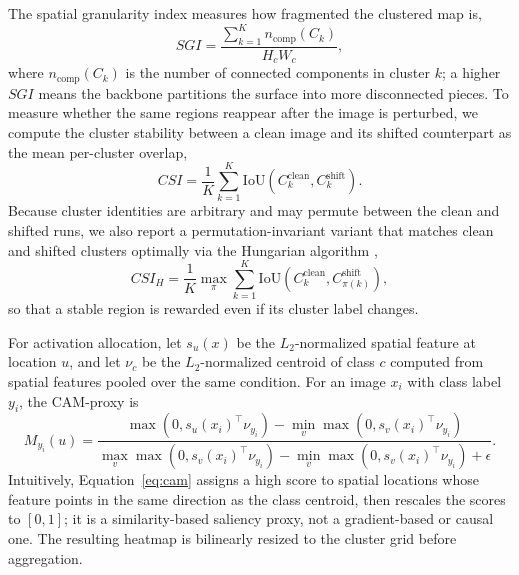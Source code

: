 \documentclass[a4paper,fleqn]{els-cas-templates/cas-sc}
\begin{document}
The spatial granularity index measures how fragmented the clustered map is,
\begin{equation}
  SGI=\frac{\sum_{k=1}^{K} n_{\mathrm{comp}}(C_k)}{H_cW_c},
\end{equation}
where $n_{\mathrm{comp}}(C_k)$ is the number of connected components in cluster
$k$; a higher $SGI$ means the backbone partitions the surface into more
disconnected pieces. To measure whether the same regions reappear after the image
is perturbed, we compute the cluster stability between a clean image and its
shifted counterpart as the mean per-cluster overlap,
\begin{equation}
  CSI=\frac{1}{K}\sum_{k=1}^{K}
  \mathrm{IoU}(C_k^{\mathrm{clean}}, C_k^{\mathrm{shift}}).
\end{equation}
Because cluster identities are arbitrary and may permute between the clean and
shifted runs, we also report a permutation-invariant variant that matches clean
and shifted clusters optimally via the Hungarian algorithm
\citep{kuhn1955hungarian},
\begin{equation}
  CSI_H=\frac{1}{K}\max_{\pi}
  \sum_{k=1}^{K}\mathrm{IoU}(C_k^{\mathrm{clean}}, C_{\pi(k)}^{\mathrm{shift}}),
\end{equation}
so that a stable region is rewarded even if its cluster label changes.

For activation allocation, let $s_u(x)$ be the $L_2$-normalized spatial feature at
location $u$, and let $\nu_c$ be the $L_2$-normalized centroid of class $c$
computed from spatial features pooled over the same condition. For an image $x_i$
with class label $y_i$, the CAM-proxy is
\begin{equation}
  M_{y_i}(u)=
  \frac{\max(0, s_u(x_i)^\top \nu_{y_i})-\min_v \max(0, s_v(x_i)^\top \nu_{y_i})}
  {\max_v \max(0, s_v(x_i)^\top \nu_{y_i})-\min_v \max(0, s_v(x_i)^\top \nu_{y_i})+\epsilon}.
  \label{eq:cam}
\end{equation}
Intuitively, Equation~\eqref{eq:cam} assigns a high score to spatial locations
whose feature points in the same direction as the class centroid, then rescales
the scores to $[0,1]$; it is a similarity-based saliency proxy, not a
gradient-based or causal one. The resulting heatmap is bilinearly resized to the
cluster grid before aggregation.
\end{document}
